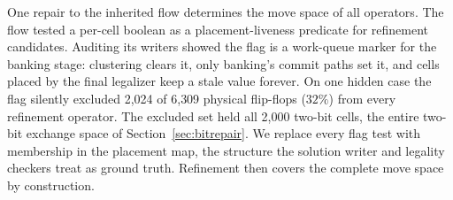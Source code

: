 One repair to the inherited flow determines the move space of all operators. The flow tested a per-cell boolean as a placement-liveness predicate for refinement candidates. Auditing its writers showed the flag is a work-queue marker for the banking stage: clustering clears it, only banking's commit paths set it, and cells placed by the final legalizer keep a stale value forever. On one hidden case the flag silently excluded 2{,}024 of 6{,}309 physical flip-flops ($32\%$) from every refinement operator. The excluded set held all 2{,}000 two-bit cells, the entire two-bit exchange space of Section~\ref{sec:bitrepair}. We replace every flag test with membership in the placement map, the structure the solution writer and legality checkers treat as ground truth. Refinement then covers the complete move space by construction.
